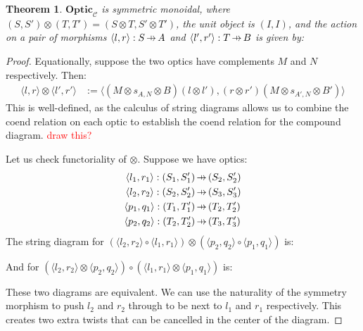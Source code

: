 \documentclass[11pt,a4paper]{article}
\theoremstyle{plain}
\newtheorem{theorem}{Theorem}[subsection]
\theoremstyle{definition}
\newcommand{\C}{\mathscr{C}}
\newcommand{\Optic}{\mathbf{Optic}}
\newcommand{\hto}{\ensuremath{\,\mathaccent\shortmid\rightarrow\,}}
\newcommand{\todo}[1]{\textcolor{red}{\small #1}}
\begin{document}
\begin{theorem}
$\Optic_\C$ is symmetric monoidal, where $(S, S') \otimes (T, T') = (S \otimes T, S' \otimes T')$, the unit object is $(I, I)$, and the action on a pair of morphisms $\langle l, r \rangle : S \hto A$ and $\langle l', r' \rangle : T \hto B$ is given by:
\begin{center}

\end{center}
\end{theorem}
\begin{proof}
Equationally, suppose the two optics have complements $M$ and $N$ respectively. Then:
\begin{align*}
\langle l, r \rangle \otimes \langle l', r' \rangle &:= \langle (M \otimes s_{A,N} \otimes B)(l \otimes l'), (r \otimes r')(M \otimes s_{A',N} \otimes B') \rangle
\end{align*}
This is well-defined, as the calculus of string diagrams allows us to combine the coend relation on each optic to establish the coend relation for the compound diagram. \todo{draw this?}

Let us check functoriality of $\otimes$. Suppose we have optics:
\begin{align*}
\langle l_1, r_1 \rangle : (S_1, S_1') &\hto (S_2, S_2') \\
\langle l_2, r_2 \rangle : (S_2, S_2') &\hto (S_3, S_3') \\
\langle p_1, q_1 \rangle : (T_1, T_1') &\hto (T_2, T_2') \\
\langle p_2, q_2 \rangle : (T_2, T_2') &\hto (T_3, T_3')
\end{align*}
The string diagram for $(\langle l_2, r_2 \rangle \circ \langle l_1, r_1 \rangle) \otimes (\langle p_2, q_2 \rangle \circ \langle p_1, q_1 \rangle)$ is:
\begin{center}

\end{center}
And for $(\langle l_2, r_2 \rangle \otimes \langle p_2, q_2 \rangle) \circ (\langle l_1, r_1 \rangle \otimes \langle p_1, q_1 \rangle)$ is:
\begin{center}

\end{center}
These two diagrams are equivalent. We can use the naturality of the symmetry morphism to push $l_2$ and $r_2$ through to be next to $l_1$ and $r_1$ respectively. This creates two extra twists that can be cancelled in the center of the diagram.


\end{proof}
\end{document}
